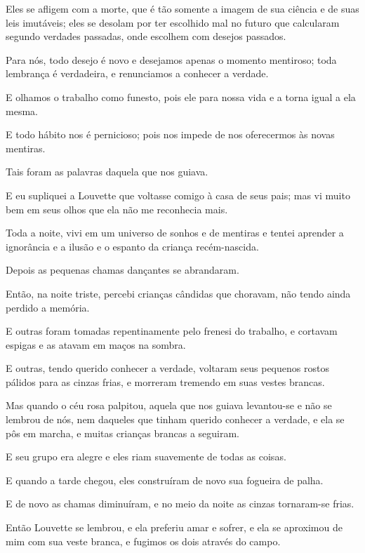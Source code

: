 Eles se afligem com a morte, que é tão somente a imagem de sua ciência
e de suas leis imutáveis; eles se desolam por ter escolhido mal no futuro
que calcularam segundo verdades passadas, onde escolhem com desejos
passados.

Para nós, todo desejo é novo e desejamos apenas o momento mentiroso;
toda lembrança é verdadeira, e renunciamos a conhecer a verdade.

E olhamos o trabalho como funesto, pois ele para nossa vida e a torna
igual a ela mesma.

E todo hábito nos é pernicioso; pois nos impede de nos oferecermos às
novas mentiras.

Tais foram as palavras daquela que nos guiava.

E eu supliquei a Louvette que voltasse comigo à casa de seus pais; mas
vi muito bem em seus olhos que ela não me reconhecia mais.

Toda a noite, vivi em um universo de sonhos e de mentiras e tentei
aprender a ignorância e a ilusão e o espanto da criança recém-nascida.

Depois as pequenas chamas dançantes se abrandaram.

Então, na noite triste, percebi crianças cândidas que choravam, não
tendo ainda perdido a memória.

E outras foram tomadas repentinamente pelo frenesi do trabalho, e
cortavam espigas e as atavam em maços na sombra.

E outras, tendo querido conhecer a verdade, voltaram seus pequenos
rostos pálidos para as cinzas frias, e morreram tremendo em suas vestes
brancas.

Mas quando o céu rosa palpitou, aquela que nos guiava levantou-se e não
se lembrou de nós, nem daqueles que tinham querido conhecer a verdade, e
ela se pôs em marcha, e muitas crianças brancas a seguiram.

E seu grupo era alegre e eles riam suavemente de todas as coisas.

E quando a tarde chegou, eles construíram de novo sua fogueira de
palha.

E de novo as chamas diminuíram, e no meio da noite as cinzas
tornaram-se frias.

Então Louvette se lembrou, e ela preferiu amar e sofrer, e ela se aproximou 
de mim com sua veste branca, e fugimos os dois através do campo.


